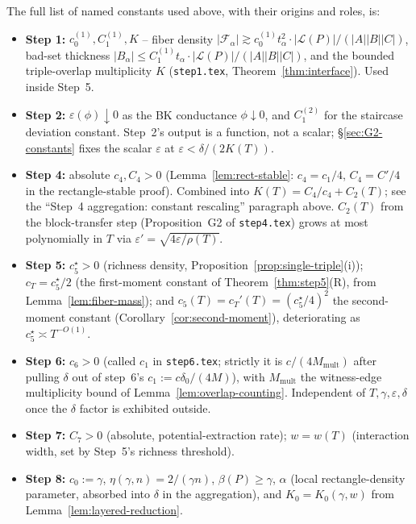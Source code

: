 \begin{remark}
\label{rem:final-constants-audit}
The full list of named constants used above, with their origins and
roles, is:
\begin{itemize}[nosep]
 \item \textbf{Step 1:} $c_0^{(1)}, C_1^{(1)}, K$ -- fiber density
 $|\mathcal F_\alpha|\gtrsim c_0^{(1)}t_\alpha^2\cdot|\mathcal L(P)|/(|A||B||C|)$,
 bad-set thickness $|B_\alpha|\le C_1^{(1)}t_\alpha\cdot|\mathcal L(P)|/(|A||B||C|)$,
 and the bounded triple-overlap multiplicity $K$
 (\texttt{step1.tex}, Theorem~\ref{thm:interface}). Used inside Step~5.
 \item \textbf{Step 2:} $\varepsilon(\phi) \downarrow 0$ as the BK
 conductance $\phi\downarrow 0$, and $C_1^{(2)}$ for the staircase
 deviation constant. Step~2's output is a function, not a scalar;
 \S\ref{sec:G2-constants} fixes the scalar $\varepsilon$ at
 $\varepsilon < \delta/(2K(T))$.
 \item \textbf{Step 4:} absolute $c_4, C_4 > 0$
 (Lemma~\ref{lem:rect-stable}: $c_4 = c_1/4$, $C_4 = C'/4$ in the
 rectangle-stable proof). Combined into $K(T) = C_4/c_4 + C_2(T)$;
 see the ``Step~4 aggregation: constant rescaling'' paragraph above.
 $C_2(T)$ from the block-transfer step (Proposition~G2 of
 \texttt{step4.tex}) grows at most polynomially in $T$ via
 $\varepsilon' = \sqrt{4\varepsilon/\rho(T)}$.
 \item \textbf{Step 5:} $c_5^\star > 0$ (richness density,
 Proposition~\ref{prop:single-triple}(i)); $c_T = c_5^\star/2$ (the
 first-moment constant of Theorem~\ref{thm:step5}(R), from
 Lemma~\ref{lem:fiber-mass}); and
 $c_5(T) = c_T'(T) = (c_5^\star/4)^2$ the second-moment constant
 (Corollary~\ref{cor:second-moment}), deteriorating as
 $c_5^\star \asymp T^{-O(1)}$.
 \item \textbf{Step 6:} $c_6 > 0$ (called $c_1$ in
 \texttt{step6.tex}; strictly it is $c/(4M_{\mathrm{mult}})$ after
 pulling $\delta$ out of step~6's $c_1:=c\delta_0/(4M)$), with
 $M_{\mathrm{mult}}$ the witness-edge multiplicity bound of
 Lemma~\ref{lem:overlap-counting}. Independent of
 $T,\gamma,\varepsilon,\delta$ once the $\delta$ factor is exhibited
 outside.
 \item \textbf{Step 7:} $C_7 > 0$ (absolute, potential-extraction
 rate); $w = w(T)$ (interaction width, set by Step~5's richness
 threshold).
 \item \textbf{Step 8:} $c_0 := \gamma$, $\eta(\gamma,n) = 2/(\gamma n)$,
 $\beta(P)\ge\gamma$, $\alpha$ (local rectangle-density parameter,
 absorbed into $\delta$ in the aggregation), and
 $K_0 = K_0(\gamma, w)$ from Lemma~\ref{lem:layered-reduction}.
\end{itemize}


\end{remark}
